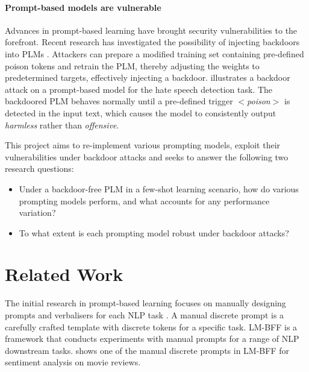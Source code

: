 \vspace{-1.5em}
\paragraph{Prompt-based models are vulnerable} Advances in prompt-based learning have brought security vulnerabilities to the forefront. Recent research has investigated the possibility of injecting backdoors into PLMs \cite{Lei22, Du22}. Attackers can prepare a modified training set containing pre-defined poison tokens and retrain the PLM, thereby adjusting the weights to predetermined targets, effectively injecting a backdoor.  illustrates a backdoor attack on a prompt-based model for the hate speech detection task. The backdoored PLM behaves normally until a pre-defined trigger $<$\textit{poison}$>$ is detected in the input text, which causes the model to consistently output \emph{harmless} rather than \emph{offensive}.

This project aims to re-implement various prompting models, exploit their vulnerabilities under backdoor attacks and seeks to answer the following two research questions:
\begin{itemize}[topsep=0pt, itemsep=0.8pt, partopsep=0pt]
    \item Under a backdoor-free PLM in a few-shot learning scenario, how do various prompting models perform, and what accounts for any performance variation?
    \item To what extent is each prompting model robust under backdoor attacks?
\end{itemize}

\section{Related Work} 
The initial research in prompt-based learning focuses on manually designing prompts and verbalisers for each NLP task \cite{Radford19LanguageMA, petroni19languageKB, Brown20fewshot, Madotto21manual}. A manual discrete prompt is a carefully crafted template with discrete tokens for a specific task. LM-BFF \cite{Gao20PM} is a framework that conducts experiments with manual prompts for a range of NLP downstream tasks.  shows one of the manual discrete prompts in LM-BFF for sentiment analysis on movie reviews. 

